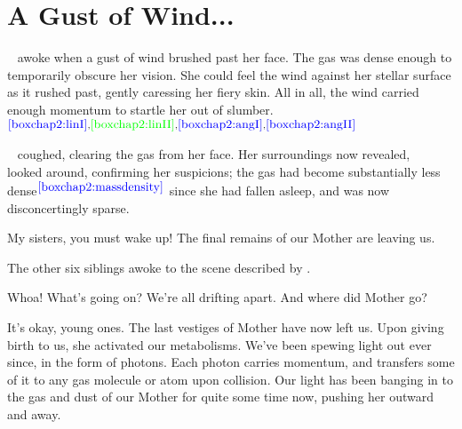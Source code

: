 \documentclass[main.tex]{subfiles}
\begin{document}

\chapter{A Gust of Wind...}

\par \nar \rmsterope~ awoke when a gust of wind brushed past her face.  The gas was dense enough to temporarily obscure her vision.  She could feel the wind against her stellar surface as it rushed past, gently caressing her fiery skin.  All in all, the wind carried enough momentum to startle her out of slumber.$^{\textcolor{blue}{\ref{boxchap2:linI}},\textcolor{green}{{\ref{boxchap2:linII}}},\textcolor{blue}{\ref{boxchap2:angI}},\textcolor{blue}{\ref{boxchap2:angII}}}$%

\par \nar \rmsterope~ coughed, clearing the gas from her face.  Her surroundings now revealed, \rmsterope~ looked around, confirming her suspicions; the gas had become substantially less dense$^{\textcolor{blue}{\ref{boxchap2:massdensity}}}$ since she had fallen asleep, and was now disconcertingly sparse. 

\par \Sterope My sisters, you must wake up!  The final remains of our Mother are leaving us.

\par \nar The other six siblings awoke to the scene described by \rmsterope.  

\par \Electra Whoa!  What's going on?  We're all drifting apart.  And where did Mother go?

\par \Maia It's okay, young ones.  The last vestiges of Mother have now left us.  Upon giving birth to us, she activated our metabolisms.  We've been spewing light out ever since, in the form of photons.  Each photon carries momentum, and transfers some of it to any gas molecule or atom upon collision.  Our light has been banging in to the gas and dust of our Mother for quite some time now, pushing her outward and away.

\end{document}
